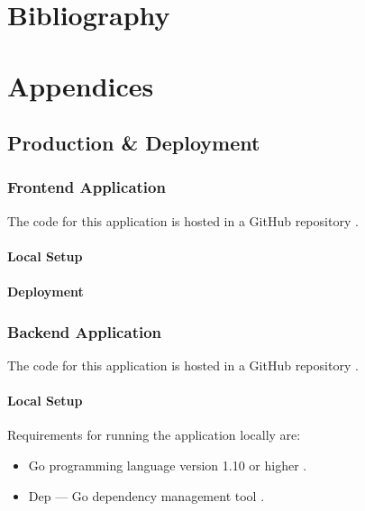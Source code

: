 \documentclass[a4paper,11pt]{article}
\begin{document}

\section{Bibliography}

\printbibliography{}

\section{Appendices}

\subsection{Production \& Deployment}

\subsubsection{Frontend Application}

The code for this application is hosted in a GitHub repository
\autocite{github:13}.

\paragraph{Local Setup}


\paragraph{Deployment}

\subsubsection{Backend Application}

The code for this application is hosted in a GitHub repository
\autocite{github:14}.

\paragraph{Local Setup}

Requirements for running the application locally are:

\begin{itemize}
  \item Go programming language version 1.10 or higher \autocite{go:8}.
  \item Dep --- Go dependency management tool \autocite{dep:12}.
\end{itemize}
\end{document}
